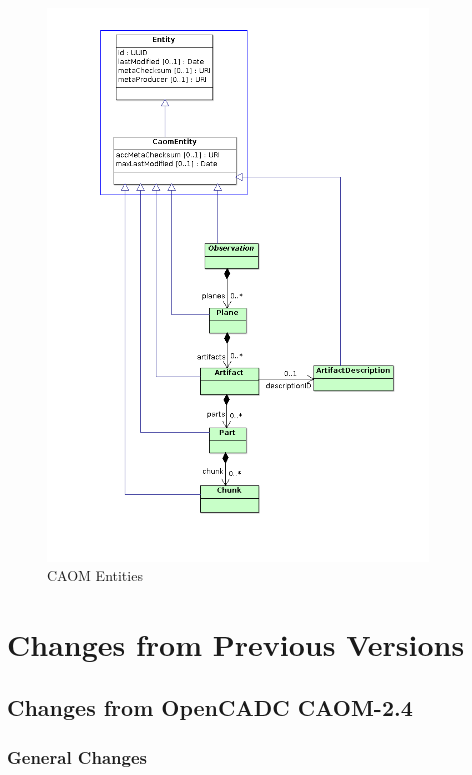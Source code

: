 \documentclass[11pt,a4paper]{ivoa}
\begin{document}
\begin{figure}
\centering
\includegraphics[width=0.9\textwidth]{src/uml/CAOM4entities.png}
\caption{CAOM Entities}
\label{fig:entity}
\end{figure}




\appendix
\section{Changes from Previous Versions}

\subsection{Changes from OpenCADC CAOM-2.4}

\subsubsection{General Changes}
\end{document}
